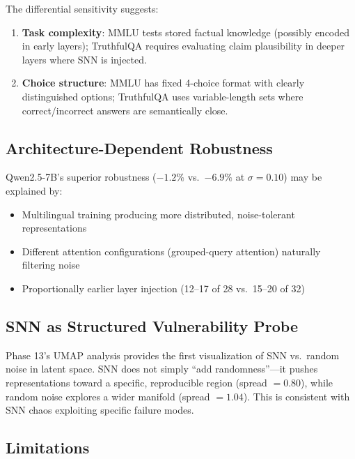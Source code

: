 \documentclass[11pt,a4paper]{article}
\begin{document}
The differential sensitivity suggests:
\begin{enumerate}
    \item \textbf{Task complexity}: MMLU tests stored factual knowledge (possibly encoded in early layers); TruthfulQA requires evaluating claim plausibility in deeper layers where SNN is injected.
    \item \textbf{Choice structure}: MMLU has fixed 4-choice format with clearly distinguished options; TruthfulQA uses variable-length sets where correct/incorrect answers are semantically close.
\end{enumerate}

\subsection{Architecture-Dependent Robustness}

Qwen2.5-7B's superior robustness ($-1.2\%$ vs.\ $-6.9\%$ at $\sigma=0.10$) may be explained by:
\begin{itemize}
    \item Multilingual training producing more distributed, noise-tolerant representations
    \item Different attention configurations (grouped-query attention) naturally filtering noise
    \item Proportionally earlier layer injection (12--17 of 28 vs.\ 15--20 of 32)
\end{itemize}

\subsection{SNN as Structured Vulnerability Probe}

Phase 13's UMAP analysis provides the first visualization of SNN vs.\ random noise in latent space. SNN does not simply ``add randomness''---it pushes representations toward a specific, reproducible region (spread $= 0.80$), while random noise explores a wider manifold (spread $= 1.04$). This is consistent with SNN chaos exploiting specific failure modes.

\subsection{Limitations}
\end{document}
